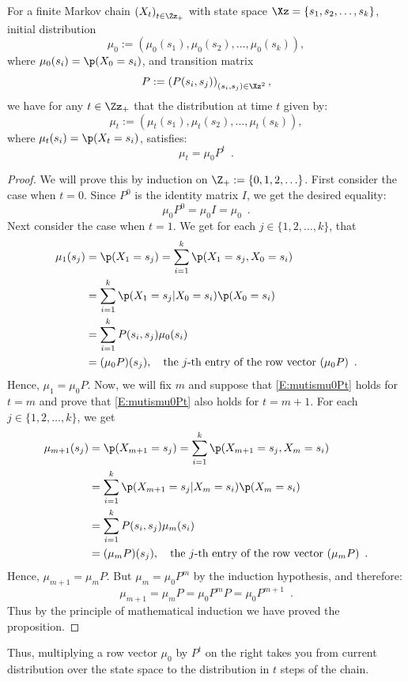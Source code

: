\begin{prop}\label{P:FiniteMCProbsAtTimet}
For a finite Markov chain $\left(X_t\right)_{t \in \Zz_+}$ with state space $\Xz=\{s_1,s_2,\ldots,s_k\}$, initial distribution $$\mu_0 := \left( \mu_0(s_1), \mu_0(s_2), \ldots, \mu_0(s_k) \right),$$ where $\mu_0(s_i) = \p(X_0=s_i)$, and transition matrix $$P := \left(P(s_i,s_j)\right)_{(s_i,s_j)\in \Xz^2},$$ we have for any $t \in \Zz_+$ that the distribution at time $t$ given by:
$$\mu_t := \left( \mu_t(s_1), \mu_t(s_2), \ldots, \mu_t(s_k) \right),$$
where $\mu_t(s_i) = \p(X_t=s_i)$, satisfies:
\begin{equation}\label{E:mutismu0Pt}
\mu_t = \mu_0 P^t \enspace .
\end{equation}
\begin{proof}
We will prove this by induction on $\Z_+:=\{0,1,2,\ldots\}$.  First consider the case when $t=0$.  Since $P^0$ is the identity matrix $I$, we get the desired equality:
\[
\mu_0 P^0 = \mu_0 I = \mu_0 \enspace .
\]
Next consider the case when $t=1$.  We get for each $j \in \{1,2,\ldots,k\}$, that
\begin{align*}
\mu_1(s_j) &= \p(X_1 = s_j) = \sum_{i=1}^k \p(X_1=s_j,X_0=s_i)\\
&= \sum_{i=1}^k \p(X_1=s_j | X_0=s_i) \p(X_0=s_i) \\
&= \sum_{i=1}^k P(s_i,s_j) \mu_0(s_i)\\
&= (\mu_0 P)(s_j), \quad \text{the $j$-th entry of the row vector $(\mu_0 P)$} \enspace .
\end{align*}
Hence, $\mu_1=\mu_0 P$.  Now, we will fix $m$ and suppose that \eqref{E:mutismu0Pt} holds for $t=m$ and prove that \eqref{E:mutismu0Pt} also holds for $t=m+1$.  
For each $j \in \{1,2,\ldots,k\}$, we get
\begin{align*}
\mu_{m+1}(s_j) &= \p(X_{m+1} = s_j) = \sum_{i=1}^k \p(X_{m+1}=s_j,X_m=s_i)\\
&= \sum_{i=1}^k \p(X_{m+1}=s_j | X_m=s_i) \p(X_m=s_i) \\
&= \sum_{i=1}^k P(s_i,s_j) \mu_m(s_i)\\
&= (\mu_m P)(s_j), \quad \text{the $j$-th entry of the row vector $(\mu_m P)$} \enspace .
\end{align*}
Hence, $\mu_{m+1}=\mu_m P$.  But $\mu_{m}=\mu_0 P^m$ by the induction hypothesis, and therefore:
\[
\mu_{m+1} = \mu_m P = \mu_0 P^m P = \mu_0 P^{m+1} \enspace .
\]
Thus by the principle of mathematical induction we have proved the proposition.
\end{proof}
\end{prop}
Thus, multiplying a row vector $\mu_0$ by $P^t$ on the right takes you from current distribution over the state space to the distribution in $t$ steps of the chain.  

